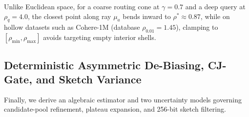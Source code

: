 Unlike Euclidean space, for a coarse routing cone at $\gamma = 0.7$ and a deep query at $\rho_q = 4.0$, the closest point along ray $\mu_a$ bends inward to $\rho^* \approx 0.87$, while on hollow datasets such as {Cohere-1M} (database $\rho_{0.01}=1.45$), clamping to $[\rho_{\min}, \rho_{\max}]$ avoids targeting empty interior shells.

\subsection{Deterministic Asymmetric De-Biasing, CJ-Gate, and Sketch Variance}
\label{subsec:asym_cj}

Finally, we derive an algebraic estimator and two uncertainty models governing candidate-pool refinement, plateau expansion, and 256-bit sketch filtering.

